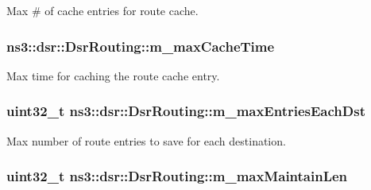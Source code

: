 Max \# of cache entries for route cache. 

\subsubsection[{\texorpdfstring{m\+\_\+max\+Cache\+Time}{m_maxCacheTime}}]{ ns3\+::dsr\+::\+Dsr\+Routing\+::m\+\_\+max\+Cache\+Time\hspace{0.3cm}{\ttfamily [private]}}\hypertarget{classns3_1_1dsr_1_1DsrRouting_a76d8abfedbda7429e983c407748400be}{}\label{classns3_1_1dsr_1_1DsrRouting_a76d8abfedbda7429e983c407748400be}


Max time for caching the route cache entry. 

\subsubsection[{\texorpdfstring{m\+\_\+max\+Entries\+Each\+Dst}{m_maxEntriesEachDst}}]{\setlength{\rightskip}{0pt plus 5cm}uint32\+\_\+t ns3\+::dsr\+::\+Dsr\+Routing\+::m\+\_\+max\+Entries\+Each\+Dst\hspace{0.3cm}{\ttfamily [private]}}\hypertarget{classns3_1_1dsr_1_1DsrRouting_a470ec4bd470cd1d802621752331d9916}{}\label{classns3_1_1dsr_1_1DsrRouting_a470ec4bd470cd1d802621752331d9916}


Max number of route entries to save for each destination. 

\subsubsection[{\texorpdfstring{m\+\_\+max\+Maintain\+Len}{m_maxMaintainLen}}]{\setlength{\rightskip}{0pt plus 5cm}uint32\+\_\+t ns3\+::dsr\+::\+Dsr\+Routing\+::m\+\_\+max\+Maintain\+Len\hspace{0.3cm}{\ttfamily [private]}}\hypertarget{classns3_1_1dsr_1_1DsrRouting_a65f608e0cfba00495392f94938fc02c0}{}\label{classns3_1_1dsr_1_1DsrRouting_a65f608e0cfba00495392f94938fc02c0}


